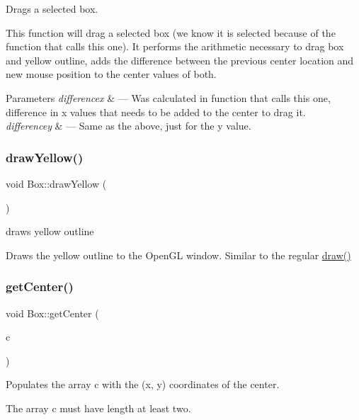 Drags a selected box. 

This function will drag a selected box (we know it is selected because of the function that calls this one). It performs the arithmetic necessary to drag box and yellow outline, adds the difference between the previous center location and new mouse position to the center values of both.


\begin{DoxyParams}{Parameters}
{\em differencex} & --- Was calculated in function that calls this one, difference in x values that needs to be added to the center to drag it. \\
\hline
{\em differencey} & --- Same as the above, just for the y value. \\
\hline
\end{DoxyParams}
\mbox{\label{class_box_adac20cad0ebf27da08d6b251c848d42a}} 
\subsubsection{\texorpdfstring{draw\+Yellow()}{drawYellow()}}
{\footnotesize\ttfamily void Box\+::draw\+Yellow (\begin{DoxyParamCaption}{ }\end{DoxyParamCaption})}



draws yellow outline 

Draws the yellow outline to the Open\+GL window. Similar to the regular \hyperlink{class_box_a17f768f00ee22cb18146a4150f9ae396}{draw()} \mbox{\label{class_box_afe94c473ef4bb934fc6dd9a554ec4e37}} 
\subsubsection{\texorpdfstring{get\+Center()}{getCenter()}}
{\footnotesize\ttfamily void Box\+::get\+Center (\begin{DoxyParamCaption}\item[{G\+Lfloat $\ast$}]{c }\end{DoxyParamCaption})}



Populates the array c with the (x, y) coordinates of the center. 

The array c must have length at least two. \mbox{\label{class_box_a397d78400d99dfc74bb831922f02fa69}} 
